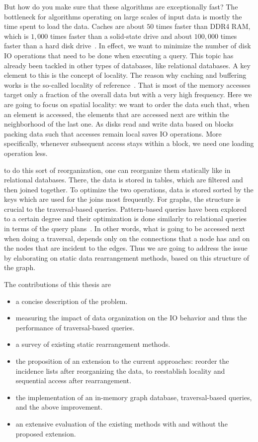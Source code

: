 But how do you make sure that these algorithms are exceptionally fast?
The bottleneck for algorithms operating on large scales of input data is mostly the time spent to load the data. 
Caches are about $50$ times faster than DDR4 RAM, which is $1,000$ times faster than a solid-state drive and about $100,000$ times faster than a hard disk drive~\autocite{mem-h}.
In effect, we want to minimize the number of disk IO operations that need to be done when executing a query.
This topic has already been tackled in other types of databases, like relational databases.
A key element to this is the concept of locality. 
The reason why caching and buffering works is the so-called locality of reference~\autocite{tanenbaum2015modern, jacob2010memory}. 
That is most of the memory accesses target only a fraction of the overall data but with a very high frequency. 
Here we are going to focus on spatial locality: 
we want to order the data such that, when an element is accessed, the elements that are accessed next are within the neighborhood of the last one. 
As disks read and write data based on blocks packing data such that accesses remain local saves IO operations. 
More specifically, whenever subsequent access stays within a block, we need one loading operation less.

to do this sort of reorganization, one can reorganize them statically like in relational databases. 
There, the data is stored in tables, which are filtered and then joined together. 
To optimize the two operations, data is stored sorted by the keys which are used for the joins most frequently.
For graphs, the structure is crucial to the traversal-based queries.
Pattern-based queries have been explored to a certain degree and their optimization is done similarly to relational queries in terms of the query plans~\autocite{Gubichev2015QueryPA}.
In other words, what is going to be accessed next when doing a traversal, depends only on the connections that a node has and on the nodes that are incident to the edges. 
Thus we are going to address the issue by elaborating on static data rearrangement methods, based on this structure of the graph.

The contributions of this thesis are 
\begin{itemize}
 \item a concise description of the problem.
 \item measuring the impact of data organization on the IO behavior and thus the performance of traversal-based queries.
 \item a survey of existing static rearrangement methods.
 \item the proposition of an extension to the current approaches: 
 reorder the incidence lists after reorganizing the data, to reestablish locality and sequential access after rearrangement.
 \item the implementation of an in-memory graph database, traversal-based queries, and the above improvement.
 \item an extensive evaluation of the existing methods with and without the proposed extension.
\end{itemize}

